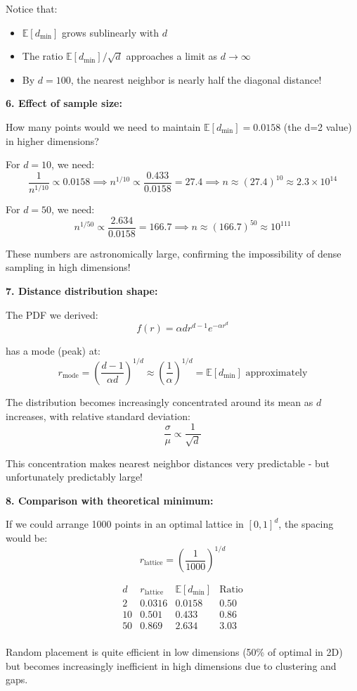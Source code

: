 \documentclass[12pt]{article}
\begin{document}
\begin{computation}
Notice that:
\begin{itemize}
    \item \(\mathbb{E}[d_{\min}]\) grows sublinearly with \(d\)
    \item The ratio \(\mathbb{E}[d_{\min}]/\sqrt{d}\) approaches a limit as \(d \to \infty\)
    \item By \(d=100\), the nearest neighbor is nearly half the diagonal distance!
\end{itemize}

\textbf{6. Effect of sample size:}

How many points would we need to maintain \(\mathbb{E}[d_{\min}] = 0.0158\) (the d=2 value) in higher dimensions?

For \(d=10\), we need:
\[
\frac{1}{n^{1/10}} \propto 0.0158 \implies n^{1/10} \propto \frac{0.433}{0.0158} = 27.4 \implies n \approx (27.4)^{10} \approx 2.3 \times 10^{14}
\]

For \(d=50\), we need:
\[
n^{1/50} \propto \frac{2.634}{0.0158} = 166.7 \implies n \approx (166.7)^{50} \approx 10^{111}
\]

These numbers are astronomically large, confirming the impossibility of dense sampling in high dimensions!

\textbf{7. Distance distribution shape:}

The PDF we derived:
\[
f(r) = \alpha d r^{d-1} e^{-\alpha r^d}
\]

has a mode (peak) at:
\[
r_{\text{mode}} = \left(\frac{d-1}{\alpha d}\right)^{1/d} \approx \left(\frac{1}{\alpha}\right)^{1/d} = \mathbb{E}[d_{\min}] \text{ approximately}
\]

The distribution becomes increasingly concentrated around its mean as \(d\) increases, with relative standard deviation:
\[
\frac{\sigma}{\mu} \propto \frac{1}{\sqrt{d}}
\]

This concentration makes nearest neighbor distances very predictable - but unfortunately predictably large!

\textbf{8. Comparison with theoretical minimum:}

If we could arrange 1000 points in an optimal lattice in \([0,1]^d\), the spacing would be:
\[
r_{\text{lattice}} = \left(\frac{1}{1000}\right)^{1/d}
\]

\[
\begin{array}{c|c|c|c}
d & r_{\text{lattice}} & \mathbb{E}[d_{\min}] & \text{Ratio} \\
\hline
2 & 0.0316 & 0.0158 & 0.50 \\
10 & 0.501 & 0.433 & 0.86 \\
50 & 0.869 & 2.634 & 3.03 \\
\end{array}
\]

Random placement is quite efficient in low dimensions (50\% of optimal in 2D) but becomes increasingly inefficient in high dimensions due to clustering and gaps.
\end{computation}
\end{document}

